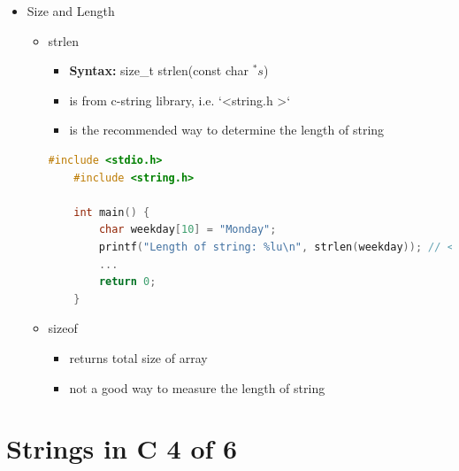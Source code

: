 \documentclass[12pt]{article}
\begin{document}
\begin{itemize}
    \item Size and Length
    \begin{itemize}
        \item strlen
        \begin{itemize}
            \item \textbf{Syntax:} size\_t strlen(const char $^*s$)
            \item is from c-string library, i.e. `\textless string.h \textgreater`
            \item is the recommended way to determine the length of string
        \end{itemize}

    \begin{lstlisting}[language=c,caption={strings\_example\_3.c}]
    #include <stdio.h>
    #include <string.h>

    int main() {
        char weekday[10] = "Monday";
        printf("Length of string: %lu\n", strlen(weekday)); // <- Returns 6
        ...
        return 0;
    }
    \end{lstlisting}

        \item sizeof
        \begin{itemize}
            \item returns total size of array
            \item not a good way to measure the length of string
        \end{itemize}
    \end{itemize}
\end{itemize}

\bigskip

\section*{Strings in C 4 of 6}

\bigskip
\end{document}
